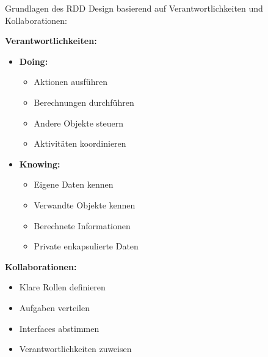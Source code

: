 \begin{concept}{Grundlagen des RDD}
Design basierend auf Verantwortlichkeiten und Kollaborationen:

\textbf{Verantwortlichkeiten:}
\begin{itemize}
    \item \textbf{Doing:}
    \begin{itemize}
        \item Aktionen ausführen
        \item Berechnungen durchführen
        \item Andere Objekte steuern
        \item Aktivitäten koordinieren
    \end{itemize}
    
    \item \textbf{Knowing:}
    \begin{itemize}
        \item Eigene Daten kennen
        \item Verwandte Objekte kennen
        \item Berechnete Informationen
        \item Private enkapsulierte Daten
    \end{itemize}
\end{itemize}

\textbf{Kollaborationen:}
\begin{itemize}
    \item Klare Rollen definieren
    \item Aufgaben verteilen
    \item Interfaces abstimmen
    \item Verantwortlichkeiten zuweisen
\end{itemize}
\end{concept}

